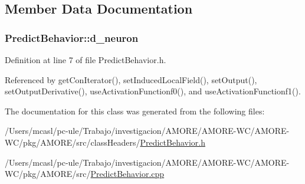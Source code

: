 \subsection{Member Data Documentation}
\hypertarget{class_predict_behavior_a49a9daba3c9e798fc7815ac44b645dc0}{
\subsubsection[{d\_\-neuron}]{ {\bf PredictBehavior::d\_\-neuron}}}
\label{class_predict_behavior_a49a9daba3c9e798fc7815ac44b645dc0}


Definition at line 7 of file PredictBehavior.h.



Referenced by getConIterator(), setInducedLocalField(), setOutput(), setOutputDerivative(), useActivationFunctionf0(), and useActivationFunctionf1().



The documentation for this class was generated from the following files:\begin{DoxyCompactItemize}
\item 
/Users/mcasl/pc-\/ule/Trabajo/investigacion/AMORE/AMORE-\/WC/AMORE-\/WC/pkg/AMORE/src/classHeaders/\hyperlink{_predict_behavior_8h}{PredictBehavior.h}\item 
/Users/mcasl/pc-\/ule/Trabajo/investigacion/AMORE/AMORE-\/WC/AMORE-\/WC/pkg/AMORE/src/\hyperlink{_predict_behavior_8cpp}{PredictBehavior.cpp}\end{DoxyCompactItemize}
